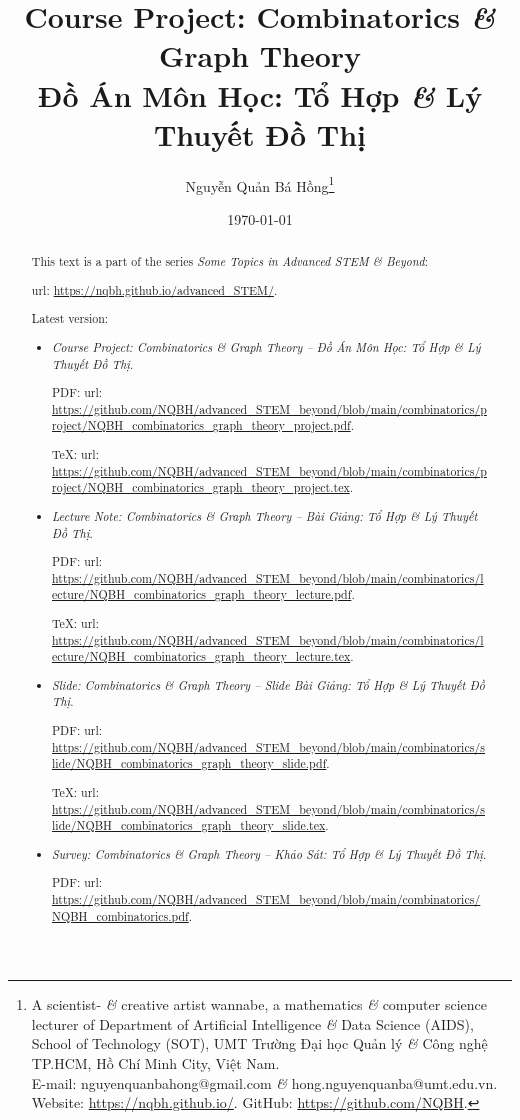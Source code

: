 \documentclass{article}
\title{Course Project: Combinatorics {\it\&} Graph Theory\\Đồ Án Môn Học: Tổ Hợp {\it\&} Lý Thuyết Đồ Thị}
\author{Nguyễn Quản Bá Hồng\footnote{A scientist- {\it\&} creative artist wannabe, a mathematics {\it\&} computer science lecturer of Department of Artificial Intelligence {\it\&} Data Science (AIDS), School of Technology (SOT), UMT Trường Đại học Quản lý {\it\&} Công nghệ TP.HCM, Hồ Chí Minh City, Việt Nam.\\E-mail: {\sf nguyenquanbahong@gmail.com} {\it\&} {\sf hong.nguyenquanba@umt.edu.vn}. Website: \url{https://nqbh.github.io/}. GitHub: \url{https://github.com/NQBH}.}}
\date{\today}
\begin{document}
\maketitle
\begin{abstract}
    This text is a part of the series {\it Some Topics in Advanced STEM \& Beyond}:
    
    {\sc url}: \url{https://nqbh.github.io/advanced_STEM/}.
    
    Latest version:
    \begin{itemize}
        \item {\it Course Project: Combinatorics \& Graph Theory -- Đồ Án Môn Học: Tổ Hợp \& Lý Thuyết Đồ Thị}.
        
        PDF: {\sc url}: \url{https://github.com/NQBH/advanced_STEM_beyond/blob/main/combinatorics/project/NQBH_combinatorics_graph_theory_project.pdf}.
        
        \TeX: {\sc url}: \url{https://github.com/NQBH/advanced_STEM_beyond/blob/main/combinatorics/project/NQBH_combinatorics_graph_theory_project.tex}.
        \item {\it Lecture Note: Combinatorics \& Graph Theory -- Bài Giảng: Tổ Hợp \& Lý Thuyết Đồ Thị}.
        
        PDF: {\sc url}: \url{https://github.com/NQBH/advanced_STEM_beyond/blob/main/combinatorics/lecture/NQBH_combinatorics_graph_theory_lecture.pdf}.
        
        \TeX: {\sc url}: \url{https://github.com/NQBH/advanced_STEM_beyond/blob/main/combinatorics/lecture/NQBH_combinatorics_graph_theory_lecture.tex}.
        \item {\it Slide: Combinatorics \& Graph Theory -- Slide Bài Giảng: Tổ Hợp \& Lý Thuyết Đồ Thị}.
        
        PDF: {\sc url}: \url{https://github.com/NQBH/advanced_STEM_beyond/blob/main/combinatorics/slide/NQBH_combinatorics_graph_theory_slide.pdf}.
        
        \TeX: {\sc url}: \url{https://github.com/NQBH/advanced_STEM_beyond/blob/main/combinatorics/slide/NQBH_combinatorics_graph_theory_slide.tex}.
        \item {\it Survey: Combinatorics \& Graph Theory -- Khảo Sát: Tổ Hợp \& Lý Thuyết Đồ Thị}.
        
        PDF: {\sc url}: \url{https://github.com/NQBH/advanced_STEM_beyond/blob/main/combinatorics/NQBH_combinatorics.pdf}.
        

\end{itemize}
\end{abstract}
\end{document}
